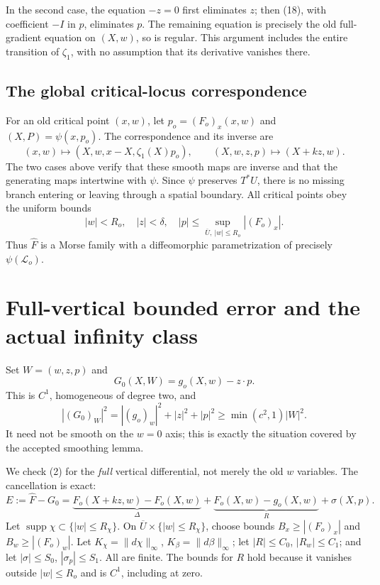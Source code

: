 \documentclass[11pt]{article}
\newcommand{\supp}{\operatorname{supp}}
\begin{document}
In the second case, the equation \(-z=0\) first eliminates \(z\);
then (18), with coefficient \(-I\) in \(p\), eliminates \(p\).
The remaining equation is precisely the old full-gradient equation
on \((X,w)\), so is regular. This argument includes the entire
transition of \(\zeta_1\), with no assumption that its derivative
vanishes there.

\subsection{The global critical-locus correspondence}

For an old critical point \((x,w)\), let
\(p_o=(F_o)_x(x,w)\) and \((X,P)=\psi(x,p_o)\).
The correspondence and its inverse are
\[
 (x,w)\longmapsto(X,w,x-X,\zeta_1(X)p_o),\qquad
 (X,w,z,p)\longmapsto(X+kz,w).
 \tag{26}
\]
The two cases above verify that these smooth maps are inverse and
that the generating maps intertwine with \(\psi\).
Since \(\psi\) preserves \(T^*U\), there is no missing branch
entering or leaving through a spatial boundary.
All critical points obey the uniform bounds
\[
 |w|<R_o,\quad |z|<\delta,\quad
 |p|\leq\sup_{\overline U,\ |w|\leq R_o}|(F_o)_x|.
 \tag{27}
\]
Thus \(\widehat F\) is a Morse family with a diffeomorphic
parametrization of precisely \(\psi(\mathcal L_o)\).

\section{Full-vertical bounded error and the actual infinity class}

Set \(W=(w,z,p)\) and
\[
 G_0(X,W)=g_o(X,w)-z\cdot p.
 \tag{28}
\]
This is \(C^1\), homogeneous of degree two, and
\[
 |(G_0)_W|^2=|(g_o)_w|^2+|z|^2+|p|^2
 \geq\min(c^2,1)|W|^2.
 \tag{29}
\]
It need not be smooth on the \(w=0\) axis; this is exactly the
situation covered by the accepted smoothing lemma.

We check (2) for the \emph{full} vertical differential, not merely
the old \(w\) variables. The cancellation is exact:
\[
 E:=\widehat F-G_0
   =\underbrace{F_o(X+kz,w)-F_o(X,w)}_{\Delta}
       +\underbrace{F_o(X,w)-g_o(X,w)}_{R}
       +\sigma(X,p).
 \tag{30}
\]
Let \(\supp\chi\subset\{|w|\leq R_\chi\}\).
On \(\overline U\times\{|w|\leq R_\chi\}\), choose bounds
\(B_x\geq|(F_o)_x|\) and \(B_w\geq|(F_o)_w|\).
Let \(K_\chi=\|d\chi\|_\infty\), \(K_\beta=\|d\beta\|_\infty\);
let \(|R|\leq C_0\), \(|R_w|\leq C_1\); and let
\(|\sigma|\leq S_0\), \(|\sigma_p|\leq S_1\).
All are finite. The bounds for \(R\) hold because it vanishes
outside \(|w|\leq R_o\) and is \(C^1\), including at zero.
\end{document}
